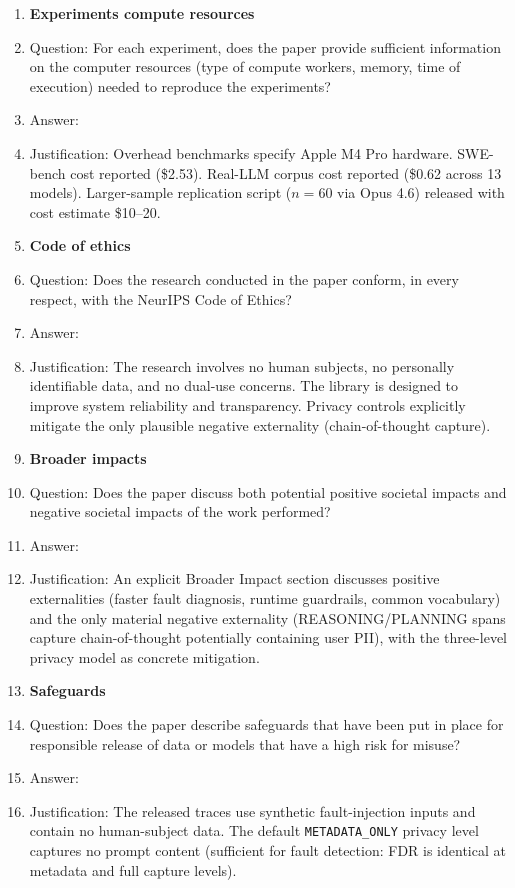 \begin{enumerate}
\item {\bf Experiments compute resources}
    \item[] Question: For each experiment, does the paper provide sufficient information on the computer resources (type of compute workers, memory, time of execution) needed to reproduce the experiments?
    \item[] Answer: \answerYes{}
    \item[] Justification: Overhead benchmarks specify Apple M4 Pro hardware. SWE-bench cost reported (\$2.53). Real-LLM corpus cost reported (\$0.62 across 13 models). Larger-sample replication script ($n{=}60$ via Opus 4.6) released with cost estimate \$10--20.

\item {\bf Code of ethics}
    \item[] Question: Does the research conducted in the paper conform, in every respect, with the NeurIPS Code of Ethics?
    \item[] Answer: \answerYes{}
    \item[] Justification: The research involves no human subjects, no personally identifiable data, and no dual-use concerns. The library is designed to improve system reliability and transparency. Privacy controls explicitly mitigate the only plausible negative externality (chain-of-thought capture).

\item {\bf Broader impacts}
    \item[] Question: Does the paper discuss both potential positive societal impacts and negative societal impacts of the work performed?
    \item[] Answer: \answerYes{}
    \item[] Justification: An explicit Broader Impact section discusses positive externalities (faster fault diagnosis, runtime guardrails, common vocabulary) and the only material negative externality (REASONING/PLANNING spans capture chain-of-thought potentially containing user PII), with the three-level privacy model as concrete mitigation.

\item {\bf Safeguards}
    \item[] Question: Does the paper describe safeguards that have been put in place for responsible release of data or models that have a high risk for misuse?
    \item[] Answer: \answerYes{}
    \item[] Justification: The released traces use synthetic fault-injection inputs and contain no human-subject data. The default \texttt{METADATA\_ONLY} privacy level captures no prompt content (sufficient for fault detection: FDR is identical at metadata and full capture levels).


\end{enumerate}
